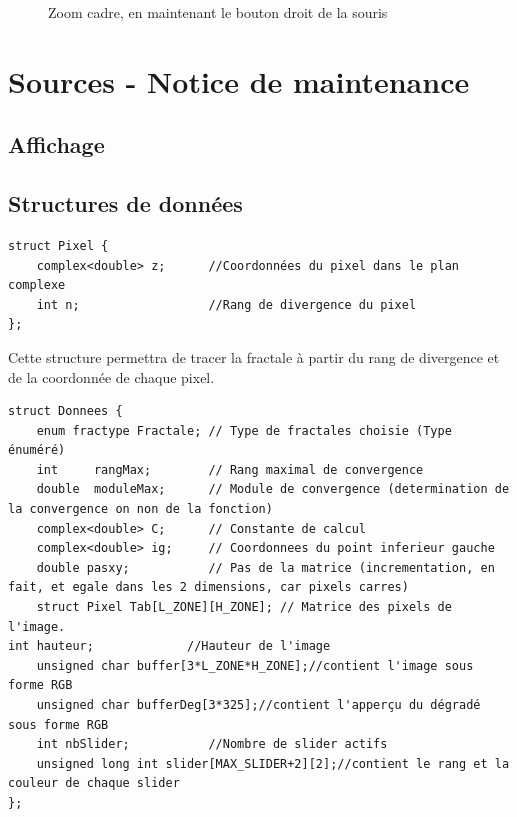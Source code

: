 \documentclass[a4paper,11pt]{article} \usepackage[T1]{fontenc} \usepackage[utf8]{inputenc} \usepackage[francais]{babel}
\begin{document}
\begin{itemize}
\begin{figure}[H]
\begin{center}
            \caption{Zoom cadre, en maintenant le bouton droit de la souris}
        \end{center} \end{figure}

\end{itemize}



\section{Sources - Notice de maintenance}

\subsection{Affichage}%

\subsection{Structures de données}
\begin{lstlisting}
struct Pixel {
    complex<double> z;      //Coordonnées du pixel dans le plan complexe
    int n;                  //Rang de divergence du pixel
};
\end{lstlisting}

Cette structure permettra de tracer la fractale à partir du rang de divergence et de la coordonnée de chaque pixel.

\begin{lstlisting}
struct Donnees {
    enum fractype Fractale; // Type de fractales choisie (Type énuméré)
    int     rangMax;        // Rang maximal de convergence
    double  moduleMax;      // Module de convergence (determination de la convergence on non de la fonction)
    complex<double> C;      // Constante de calcul
    complex<double> ig;     // Coordonnees du point inferieur gauche
    double pasxy;           // Pas de la matrice (incrementation, en fait, et egale dans les 2 dimensions, car pixels carres)
    struct Pixel Tab[L_ZONE][H_ZONE]; // Matrice des pixels de l'image.
int hauteur;             //Hauteur de l'image
    unsigned char buffer[3*L_ZONE*H_ZONE];//contient l'image sous forme RGB
    unsigned char bufferDeg[3*325];//contient l'apperçu du dégradé sous forme RGB
    int nbSlider;           //Nombre de slider actifs
    unsigned long int slider[MAX_SLIDER+2][2];//contient le rang et la couleur de chaque slider
};

\end{lstlisting}
\end{document}
